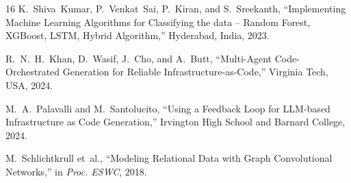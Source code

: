 \documentclass[conference]{IEEEtran}
\begin{document}
\begin{thebibliography}{16}
K.~Shiva~Kumar, P.~Venkat~Sai, P.~Kiran, and S.~Sreekanth, ``Implementing Machine Learning Algorithms for Classifying the data -- Random Forest, XGBoost, LSTM, Hybrid Algorithm,'' Hyderabad, India, 2023.

R.~N.~H.~Khan, D.~Wasif, J.~Cho, and A.~Butt, ``Multi-Agent Code-Orchestrated Generation for Reliable Infrastructure-as-Code,'' Virginia Tech, USA, 2024.

M.~A.~Palavalli and M.~Santolucito, ``Using a Feedback Loop for LLM-based Infrastructure as Code Generation,'' Irvington High School and Barnard College, 2024.

M.~Schlichtkrull et~al., ``Modeling Relational Data with Graph Convolutional Networks,'' in \textit{Proc. ESWC}, 2018.

\end{thebibliography}
\end{document}
